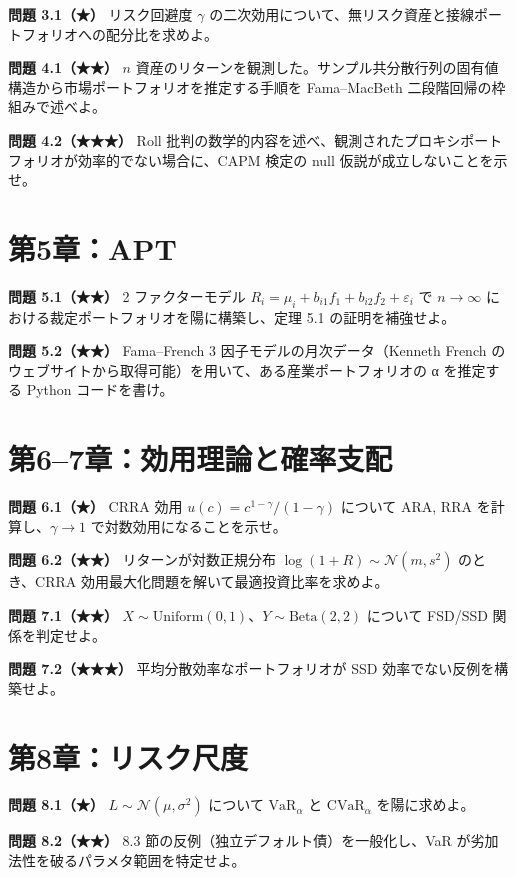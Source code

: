 \documentclass[11pt,a4paper]{report}
\begin{document}
\textbf{問題 3.1（★）} リスク回避度 $\gamma$ の二次効用について、無リスク資産と接線ポートフォリオへの配分比を求めよ。

\textbf{問題 4.1（★★）} $n$ 資産のリターンを観測した。サンプル共分散行列の固有値構造から市場ポートフォリオを推定する手順を Fama–MacBeth 二段階回帰の枠組みで述べよ。

\textbf{問題 4.2（★★★）} Roll 批判の数学的内容を述べ、観測されたプロキシポートフォリオが効率的でない場合に、CAPM 検定の null 仮説が成立しないことを示せ。

\section{第5章：APT}

\textbf{問題 5.1（★★）} 2 ファクターモデル $R_i = \mu_i + b_{i1} f_1 + b_{i2} f_2 + \varepsilon_i$ で $n \to \infty$ における裁定ポートフォリオを陽に構築し、定理 5.1 の証明を補強せよ。

\textbf{問題 5.2（★★）} Fama–French 3 因子モデルの月次データ（Kenneth French のウェブサイトから取得可能）を用いて、ある産業ポートフォリオの α を推定する Python コードを書け。

\section{第6–7章：効用理論と確率支配}

\textbf{問題 6.1（★）} CRRA 効用 $u(c) = c^{1-\gamma}/(1-\gamma)$ について ARA, RRA を計算し、$\gamma \to 1$ で対数効用になることを示せ。

\textbf{問題 6.2（★★）} リターンが対数正規分布 $\log(1 + R) \sim \mathcal{N}(m, s^2)$ のとき、CRRA 効用最大化問題を解いて最適投資比率を求めよ。

\textbf{問題 7.1（★★）} $X \sim \mathrm{Uniform}(0,1)$、$Y \sim \mathrm{Beta}(2, 2)$ について FSD/SSD 関係を判定せよ。

\textbf{問題 7.2（★★★）} 平均分散効率なポートフォリオが SSD 効率でない反例を構築せよ。

\section{第8章：リスク尺度}

\textbf{問題 8.1（★）} $L \sim \mathcal{N}(\mu, \sigma^2)$ について $\mathrm{VaR}_\alpha$ と $\mathrm{CVaR}_\alpha$ を陽に求めよ。

\textbf{問題 8.2（★★）} 8.3 節の反例（独立デフォルト債）を一般化し、VaR が劣加法性を破るパラメタ範囲を特定せよ。
\end{document}
